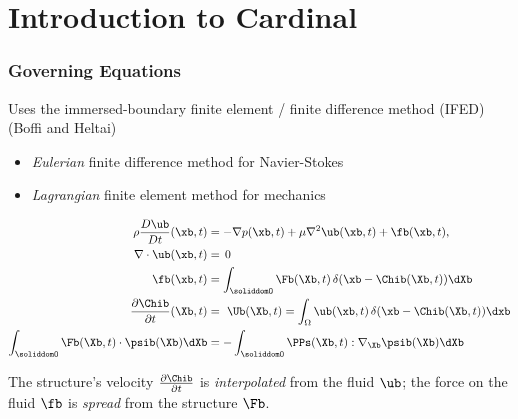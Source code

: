 \documentclass[8pt]{beamer}
\begin{document}
\section{Introduction to Cardinal}
\begin{frame}
    \frametitle{Governing Equations}
    Uses the immersed-boundary finite element / finite difference method (IFED) (Boffi and Heltai)
    \begin{itemize}
      \item \emph{Eulerian} finite difference method for Navier-Stokes
      \item \emph{Lagrangian} finite element method for mechanics
    \end{itemize}

    \begin{align*}
        \rho \frac{D\ub}{Dt}(\xb, t) &= -\nabla p(\xb, t)
        + \mu \nabla ^2 \ub(\xb, t) + \fb(\xb, t),
        \\
        \nabla \cdot \ub(\xb, t) &= \, 0
        \\
        \fb(\xb, t) &= \int_{\soliddomO} \Fb(\Xb,t) \, \delta(\xb - \Chib (\Xb,t)) \dXb
        \\
        \frac{\partial \Chib}{\partial t}(\Xb, t) &= \ \Ub(\Xb,t) = \int_{\Omega}
        \ub(\xb, t) \, \delta(\xb - \Chib (\Xb,t)) \dxb
        \\
        \int_{\soliddomO} \Fb(\Xb,t) \cdot \psib(\Xb) \dXb &=
        -\int_{\soliddomO} \PPs(\Xb,t) : \nabla_{\Xb} \psib(\Xb) \dXb
    \end{align*}

    \begin{center}
      The structure's velocity $\frac{\partial \Chib}{\partial t}$ is \emph{interpolated} from the fluid $\ub$; the force on the fluid $\fb$ is \emph{spread} from the structure $\Fb$.
    \end{center}
\end{frame}
\end{document}
